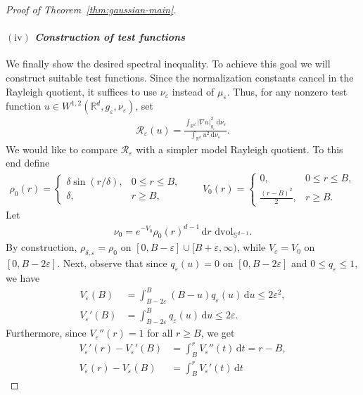\documentclass[11pt,reqno]{amsart}
\numberwithin{equation}{section}
\theoremstyle{definition}
\theoremstyle{remark}
\def\cR {\mathcal{R}}
\newcommand{\ud}{\mathrm{d}}
\newcommand{\0}{\emptyset}
\newcommand{\veps}{\varepsilon}
\newcommand{\bbR}{\mathbb R}
\newcommand{\bbS}{\mathbb S}
\newcommand{\dvol}{\,\mathrm{dvol}}
\begin{document}
\begin{proof}[Proof of Theorem~\ref{thm:gaussian-main}]
\paragraph{$\mathrm{(iv)}$ \textit{Construction of test functions}}
We finally show the desired spectral inequality. To achieve this goal we will
construct suitable test functions. Since the normalization constants cancel in the
Rayleigh quotient, it suffices to use \(\nu_\veps\) instead of \(\mu_\veps\). Thus,
for any nonzero test function \(u\in W^{1,2}(\bbR^d,g_\veps,\nu_\veps)\), set
\begin{align}
        \cR_\veps(u)
        =
        \frac{\int_{\bbR^d}|\nabla u|_{g_\veps}^2\,\ud\nu_\veps}
        {\int_{\bbR^d}u^2\,\ud\nu_\veps}.
\end{align}
We would like to compare \(\cR_\veps\) with a simpler model Rayleigh quotient. To
this end define
\begin{align}
        \rho_0(r)=
        \begin{cases}
        \delta\sin(r/\delta),&0\leq r\leq B,\\
        \delta,&r\geq B,
        \end{cases}
        \qquad
        V_0(r)=
        \begin{cases}
        0,&0\leq r\leq B,\\
        \frac{(r-B)^2}{2},&r\geq B.
        \end{cases}
\end{align}
Let
\begin{align}
        \nu_0=e^{-V_0}\rho_0(r)^{d-1}\,\ud r\,\dvol_{\bbS^{d-1}}.
\end{align}
By construction, \(\rho_{\delta,\veps}=\rho_0\) on
\([0,B-\veps]\cup [B+\veps,\infty)\), while \(V_\veps=V_0\) on
\([0,B-2\veps]\). Next, observe that since \(q_\veps(u)=0\) on
\([0,B-2\veps]\) and \(0\leq q_\veps\leq1\), we have
\begin{align}
        V_\veps(B)
        &=
        \int_{B-2\veps}^{B}(B-u)q_\veps(u)\,\ud u
        \leq 2\veps^2,\\
        V_\veps'(B)
        &=
        \int_{B-2\veps}^{B}q_\veps(u)\,\ud u
        \leq 2\veps.
\end{align}
Furthermore, since \(V_\veps''(r)=1\) for all \(r\geq B\), we get
\begin{align}
        V_\veps'(r)-V_\veps'(B)
        &=
        \int_B^r V_\veps''(t)\,\ud t
        =
        r-B,\\
        V_\veps(r)-V_\veps(B)
        &=
        \int_B^r V_\veps'(t)\,\ud t

\end{align}
\end{proof}
\end{document}
